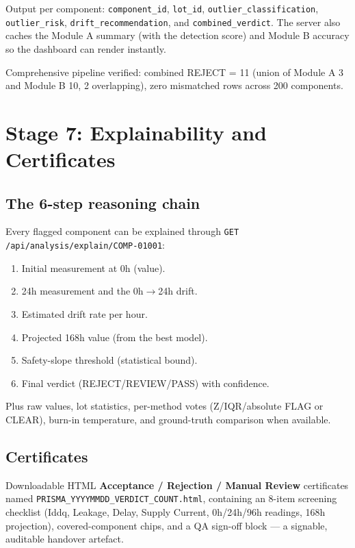 \documentclass[11pt,a4paper]{article}
\newcommand{\code}[1]{\texttt{\small #1}}
\newcommand{\keys}[1]{\textbf{\sffamily#1}}
\newcommand{\milestone}[1]{\par\vspace{0.6em}\noindent
  \begin{tcolorbox}[colback=solgreen!8,colframe=solgreen,
    title={\sffamily\bfseries\color{white}Milestone},arc=2pt,boxrule=1pt]
    #1
  \end{tcolorbox}\par\vspace{0.4em}}
\begin{document}
\noindent Output per component: \code{component\_id}, \code{lot\_id},
\code{outlier\_classification}, \code{outlier\_risk}, \code{drift\_recommendation}, and
\code{combined\_verdict}. The server also caches the Module A summary (with the detection score)
and Module B accuracy so the dashboard can render instantly.

\milestone{Comprehensive pipeline verified: combined REJECT = 11 (union of Module A 3 and
  Module B 10, 2 overlapping), zero mismatched rows across 200 components.}

\section{Stage 7: Explainability and Certificates}

\subsection*{The 6-step reasoning chain}
Every flagged component can be explained through \code{GET /api/analysis/explain/COMP-01001}:
\begin{enumerate}[leftmargin=1.5em]
  \item Initial measurement at 0h (value).
  \item 24h measurement and the 0h$\rightarrow$24h drift.
  \item Estimated drift rate per hour.
  \item Projected 168h value (from the best model).
  \item Safety-slope threshold (statistical bound).
  \item Final verdict (REJECT/REVIEW/PASS) with confidence.
\end{enumerate}
Plus raw values, lot statistics, per-method votes (Z/IQR/absolute FLAG or CLEAR), burn-in
temperature, and ground-truth comparison when available.

\subsection*{Certificates}
Downloadable HTML \keys{Acceptance / Rejection / Manual Review} certificates named
\code{PRISMA\_YYYYMMDD\_VERDICT\_COUNT.html}, containing an 8-item screening checklist (Iddq,
Leakage, Delay, Supply Current, 0h/24h/96h readings, 168h projection), covered-component chips, and
a QA sign-off block --- a signable, auditable handover artefact.
\end{document}
